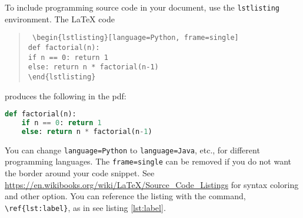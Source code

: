 To include programming source code in your document, use the 
\texttt{lstlisting} environment. The \LaTeX{} code
\begin{quote}\tt
	\textbackslash{}begin\{lstlisting\}[language=Python, frame=single] 
	\\[-0.5em]
    \hspace*{2em}def factorial(n): \\[-0.5em]
    \hspace*{4em}if n == 0: return 1 \\[-0.5em]
    \hspace*{4em}else: return n * factorial(n-1) \\[-0.5em]
    \textbackslash{}end\{lstlisting\}
\end{quote}
produces the following in the pdf: \\
\begin{lstlisting}[language=Python, frame=single, label={lst:label}, 
caption={Some Python code}]
def factorial(n):
	if n == 0: return 1
	else: return n * factorial(n-1)
\end{lstlisting}
You can change \texttt{language=Python} to \texttt{language=Java}, etc., for 
different programming languages. The \texttt{frame=single} can be removed if 
you do not want the border around your code snippet. See 
\url{https://en.wikibooks.org/wiki/LaTeX/Source_Code_Listings} for syntax 
coloring and other option. You can reference the listing with the command, 
\texttt{\textbackslash{}ref\{lst:label\}}, as in see listing \ref{lst:label}.
